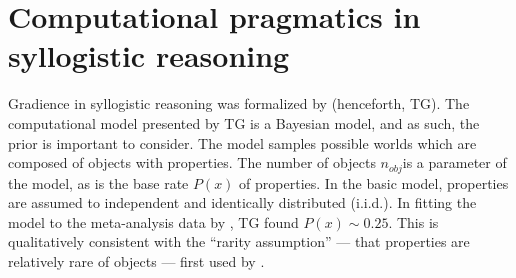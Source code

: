 \documentclass{llncs} %
\begin{document}
%



\section{Computational pragmatics in syllogistic reasoning}

Gradience in syllogistic reasoning was formalized by  (henceforth, TG). The computational model presented by TG is a Bayesian model, and as such, the prior is important to consider. The model samples possible worlds which are composed of objects with properties. The number of objects $n_{obj}$is a parameter of the model, as is the base rate $P(x)$ of properties. In the basic model, properties are assumed to independent and identically distributed (i.i.d.). In fitting the model to the meta-analysis data by , TG found $P(x) \sim 0.25$. This is qualitatively consistent with the ``rarity assumption'' --- that properties are relatively rare of objects --- first used by .
\end{document}

